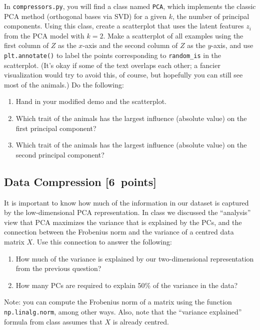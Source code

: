 \documentclass{article}
\newcommand{\blu}[1]{{\textcolor{blu}{#1}}}
\let\ask\blu
\newenvironment{asking}{\begingroup\color{blu}}{\endgroup}
\newcommand\pts[1]{\textcolor{pointscolour}{[#1~points]}}
\begin{document}
In \texttt{compressors.py}, you will find a class named \texttt{PCA}, which implements the classic PCA method (orthogonal bases via SVD) for a given $k$, the number of principal components. Using this class, create a scatterplot that uses the latent features $z_i$ from the PCA model with $k=2$.
Make a scatterplot of all examples using the first column of $Z$ as the $x$-axis and the second column of $Z$ as the $y$-axis, and use \texttt{plt.annotate()} to label the points corresponding to \verb|random_is| in the scatterplot.
(It's okay if some of the text overlaps each other; a fancier visualization would try to avoid this, of course, but hopefully you can still see most of the animals.)
Do the following:
\begin{asking}
	\begin{enumerate}
		\item  Hand in your modified demo and the scatterplot.
		\item Which trait of the animals has the largest influence (absolute value) on the first principal component?
		\item Which trait of the animals has the largest influence (absolute value) on the second principal component?
    \end{enumerate}
\end{asking}


\subsection{Data Compression \pts{6}}

It is important to know how much of the information in our dataset is captured by the low-dimensional PCA representation.
In class we discussed the ``analysis'' view that PCA maximizes the variance that is explained by the PCs, and the connection between the Frobenius norm and the variance of a centred data matrix $X$.
Use this connection to answer the following:
\begin{enumerate}
	\item \ask{How much of the variance is explained by our two-dimensional representation from the previous question?}
	\item \ask{How many PCs are required to explain 50\% of the variance in the data?}
\end{enumerate}
Note: you can compute the Frobenius norm of a matrix using the function \texttt{np.linalg.norm}, among other ways. Also, note that the ``variance explained'' formula from class assumes that $X$ is already centred.
\end{document}
